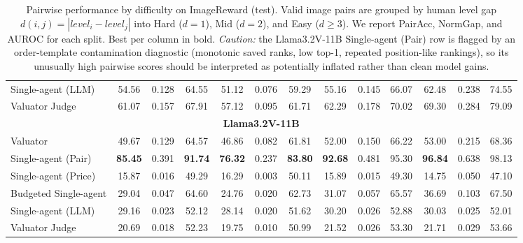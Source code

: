 \begin{table}[!t]
{\begin{tabular}{lcccccccccccc}
Single-agent (LLM)           & 54.56 & 0.128 & 64.55 & 51.12 & 0.076 & 59.29 & 55.16 & 0.145 & 66.07 & 62.48 & 0.238 & 74.55 \\
Valuator Judge               & 61.07 & 0.157 & 67.91 & 57.12 & 0.095 & 61.71 & 62.29 & 0.178 & 70.02 & 69.30 & 0.284 & 79.09 \\
\midrule
\multicolumn{13}{c}{\textbf{Llama3.2V-11B}} \\
\midrule
Valuator                     & 49.67 & 0.129 & 64.57 & 46.86 & 0.082 & 61.81 & 52.00 & 0.150 & 66.22 & 53.00 & 0.215 & 68.36 \\
Single-agent (Pair)          & \textbf{85.45} & 0.391 & \textbf{91.74} & \textbf{76.32} & 0.237 & \textbf{83.80} & \textbf{92.68} & 0.481 & 95.30 & \textbf{96.84} & 0.638 & 98.13 \\
Single-agent (Price)         & 15.87 & 0.016 & 49.29 & 16.29 & 0.003 & 50.11 & 15.89 & 0.015 & 49.30 & 14.75 & 0.050 & 47.10 \\
Budgeted Single-agent        & 29.04 & 0.047 & 64.60 & 24.76 & 0.020 & 62.73 & 31.07 & 0.057 & 65.57 & 36.69 & 0.103 & 67.50 \\
Single-agent (LLM)           & 29.16 & 0.023 & 52.12 & 28.14 & 0.020 & 51.62 & 30.20 & 0.026 & 52.88 & 30.03 & 0.025 & 52.01 \\
Valuator Judge               & 20.69 & 0.018 & 52.23 & 19.75 & 0.010 & 50.99 & 21.52 & 0.026 & 53.30 & 21.71 & 0.029 & 53.66 \\
\bottomrule
\end{tabular}
}
\caption{Pairwise performance by difficulty on ImageReward (test). Valid image pairs are grouped by human level gap $d(i,j)=|level_i-level_j|$ into Hard ($d=1$), Mid ($d=2$), and Easy ($d\geq3$). We report PairAcc, NormGap, and AUROC for each split. Best per column in bold. \textit{Caution:} the Llama3.2V-11B Single-agent (Pair) row is flagged by an order-template contamination diagnostic (monotonic saved ranks, low top-1, repeated position-like rankings), so its unusually high pairwise scores should be interpreted as potentially inflated rather than clean model gains.}
\label{tab:table13}
\end{table}
